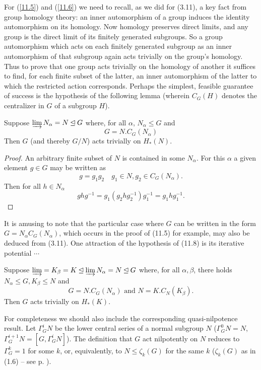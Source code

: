 For (\ref{11.5}) and (\ref{11.6}) we need to recall, as we did for (3.11), a key fact from group homology theory: an inner automorphism of a group induces the identity automorphism on its homology. Now homology preserves direct limits, and any group is the direct limit of its finitely generated subgroups. So a group automorphism which acts on each finitely generated subgroup as an inner automorphism of that subgroup again acts trivially on the group's homology. Thus to prove that one group acts trivially on the homology of another it suffices to find, for each finite subset of the latter, an inner automorphism of the latter to which the restricted action corresponds. Perhaps the simplest, feasible guarantee of success is the hypothesis of the following lemma (wherein $C_G(H)$ denotes the centralizer in $G$ of a subgroup $H$).
\begin{lemma}
  Suppose $\varinjlim N_\alpha = N \unlhd G$ where, for all $\alpha$, $N_\alpha \leqslant G$ and
  \[G=N.C_G(N_\alpha)\]
Then $G$ (and thereby $G/N$) acts trivially on $H_*(N)$.
\end{lemma}
\begin{proof}
  An arbitrary finite subset of $N$ is contained in some $N_\alpha$. For this $\alpha$ a given element $g \in G$ may be written as
\[g = g_1g_2 \quad g_1\in N, g_2\in C_G(N_\alpha).\]
Then for all $ h \in N_\alpha$
\[ghg^{-1} = g_1(g_2hg_2^{-1})g_1^{-1} = g_1hg_1^{-1}.\]
\end{proof}
It is amusing to note that the particular case where $G$ can be written in the form $G = N_\alpha C_G(N_\alpha )$, which occurs in the proof of (11.5) for example, may also be deduced from (3.11). One attraction of the hypothesis of (11.8) is its iterative potential $\cdots $
\begin{corollary}
  Suppose $\varinjlim = K_\beta =K \unlhd \varinjlim N_\alpha= N \unlhd G$ where, for all $\alpha,\beta$, there holds $N_\alpha \leqslant G, K_\beta \leqslant N$ and
  \[G = N. C_G(N_\alpha ) \mbox{ and } N = K.C_N(K_\beta).\]
Then $G$ acts trivially on $H_*(K)$.
\end{corollary}
For completeness we should also include the corresponding quasi-nilpotence result. Let $\Gamma_G^i N$ be the lower central series of a normal subgroup $N$ ($\Gamma_G^0 N = N$, $\Gamma_G^{i+1}N = [G, \Gamma_G^iN]$). The definition that $G$ act nilpotently on $N$ reduces to $\Gamma_G^k= 1$ for some $k$, or, equivalently, to $N \leqslant \zeta_k(G)$ for the same $k$ ($\zeta_k(G)$ as in (1.6) -- see p. \pageref{page37}).

